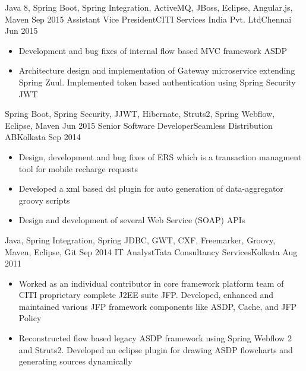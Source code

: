 \begin{experiences}
{\begin{itemize}
                      \end{itemize}
                    }
                    {Java 8, Spring Boot, Spring Integration, ActiveMQ, JBoss, Eclipse, Angular.js, Maven}
  \emptySeparator
  \experience
    {Sep 2015}     {Assistant Vice President}{CITI Services India Pvt. Ltd}{Chennai}
    {Jun 2015}    {
                      \begin{itemize}
                        \item Development and bug fixes of internal flow based MVC framework ASDP
                        \item Architecture design and implementation of Gateway microservice extending Spring Zuul. Implemented token based authentication using Spring Security JWT 
                     \end{itemize}
                    }
                    {Spring Boot, Spring Security, JJWT, Hibernate, Struts2, Spring Webflow, 
 Eclipse, Maven}
  \emptySeparator
  \experience
  {Jun 2015}       {Senior Software Developer}{Seamless Distribution AB}{Kolkata}
  {Sep 2014}       {
                       \begin{itemize}
                        \item Design, development and bug fixes of ERS which is a transaction managment tool for mobile recharge requests                               
                        \item Developed a xml based dsl plugin for auto generation of data-aggregator groovy scripts            
                        \item Design and development of several Web Service (SOAP) APIs                      
                      \end{itemize}
                    }
                    {Java, Spring Integration, Spring JDBC, GWT, CXF, Freemarker, Groovy, Maven, Eclipse, Git}
  \emptySeparator
  \experience
  {Sep 2014}      {IT Analyst}{Tata Consultancy Services}{Kolkata}
  {Aug 2011}    {
  				\begin{itemize}
  				\item Worked as an individual contributor in core framework platform team of CITI proprietary complete J2EE suite JFP. Developed, enhanced and maintained various JFP framework components like ASDP, Cache, and JFP Policy
                \item Reconstructed flow based legacy ASDP framework using Spring Webflow 2
and Struts2. Developed an eclipse plugin for drawing ASDP flowcharts and generating sources dynamically

\end{itemize}}
\end{experiences}
